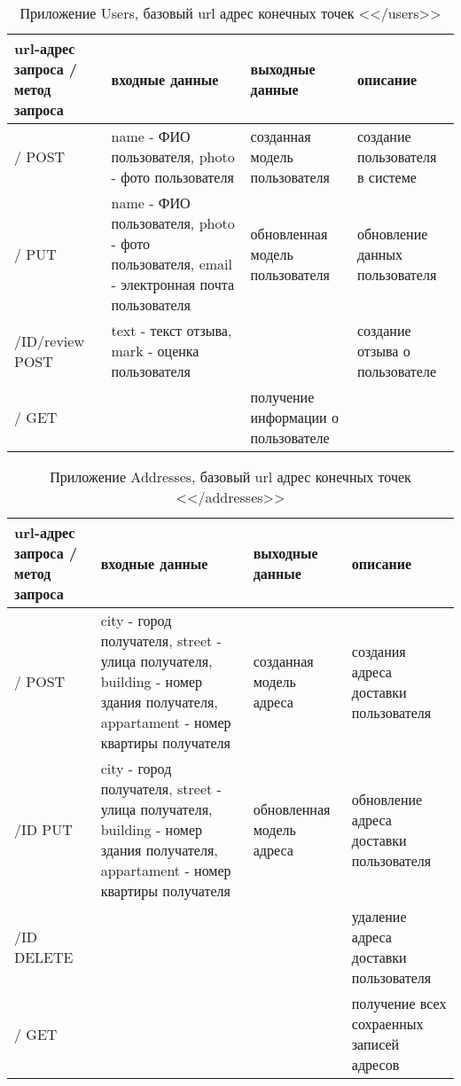 \begin{table}
    \caption{Приложение Users, базовый url адрес конечных точек <</users>>}
    \begin{tabular}{ | p{3cm} | p{4cm} | p{3cm} | p{3cm} | }
        \hline
        url-адрес запроса / метод запроса & входные данные & выходные данные  & описание \\ \hline
        / POST & name - ФИО пользователя, photo - фото пользователя & созданная модель пользователя & создание пользователя в системе \\ \hline
        / PUT & name - ФИО пользователя, photo - фото пользователя, email - электронная почта пользователя & обновленная модель пользователя & обновление данных пользователя \\ \hline
        /ID/review POST & text - текст отзыва, mark - оценка пользователя & & создание отзыва о пользователе \\ \hline
        / GET & & получение информации о пользователе \\ \hline
    \end{tabular}
\end{table}

\begin{table}
    \caption{Приложение Addresses, базовый url адрес конечных точек <</addresses>>}
    \begin{tabular}{ | p{3cm} | p{4cm} | p{3cm} | p{3cm} | }
        \hline
        url-адрес запроса / метод запроса & входные данные & выходные данные  & описание \\ \hline
        / POST & city - город получателя, street - улица получателя, building - номер здания получателя, appartament - номер квартиры получателя & созданная модель адреса & создания адреса доставки пользователя \\ \hline
        /ID PUT & city - город получателя, street - улица получателя, building - номер здания получателя, appartament - номер квартиры получателя & обновленная модель адреса & обновление адреса доставки пользователя \\ \hline
        /ID DELETE & & & удаление адреса доставки пользователя \\ \hline
        / GET & & & получение всех сохраенных записей адресов \\ \hline
    \end{tabular}
\end{table}

